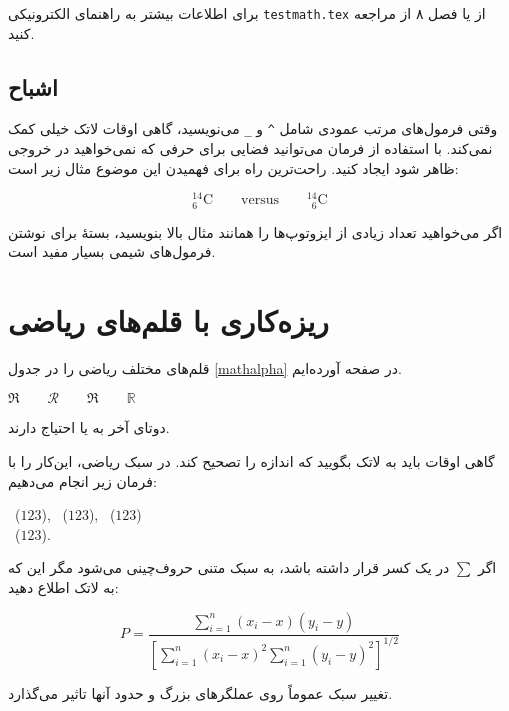برای اطلاعات بیشتر به راهنمای الکترونیکی  \texttt{testmath.tex} از \lr{\AmS-\LaTeX} یا فصل ۸ از \companion{} مراجعه کنید.
\subsection{اشباح}

وقتی فرمول‌های مرتب عمودی شامل  \verb|^| و  \verb|_| می‌نویسید، گاهی اوقات لاتک خیلی کمک نمی‌کند. با استفاده از فرمان   می‌توانید فضایی برای حرفی که نمی‌خواهید در خروجی ظاهر شود ایجاد کنید. راحت‌ترین راه برای فهمیدن این موضوع مثال زیر است:
\begin{example}
\begin{equation*}
{}^{14}_{6}\text{C}
\qquad \text{versus} \qquad
{}^{14}_{\phantom{1}6}\text{C}
\end{equation*}
\end{example}
اگر می‌خواهید تعداد زیادی از ایزو‌توپ‌ها را همانند مثال بالا بنویسید، بستۀ   برای نوشتن فرمول‌های شیمی بسیار مفید است.
\section{ریزه‌کاری با قلم‌های ریاضی}\label{sec:fontsz}
قلم‌های مختلف ریاضی را در جدول  
\ref{mathalpha}
در صفحه 
\pageref{mathalpha} آورده‌ایم.
\begin{example}
 $\Re \qquad
  \mathcal{R} \qquad
  \mathfrak{R} \qquad
  \mathbb{R} \qquad $  
\end{example}
دوتای آخر به   یا   احتیاج دارند.

گاهی اوقات باید به لاتک بگویید که اندازه را تصحیح کند. در سبک ریاضی، این‌کار را با فرمان زیر انجام می‌دهیم:

\begin{latin}
~($\displaystyle 123$),
 ~($\textstyle 123$), 
~($\scriptstyle 123$) \\
~($\scriptscriptstyle 123$).
\end{latin}

اگر $\sum$ در یک کسر قرار داشته باشد، به سبک متنی حروف‌چینی می‌شود مگر این که به لاتک اطلاع دهید:
\begin{example}
\begin{equation*}
 P = \frac{\displaystyle{ 
   \sum_{i=1}^n (x_i- x)
   (y_i- y)}} 
   {\displaystyle{\left[
   \sum_{i=1}^n(x_i-x)^2
   \sum_{i=1}^n(y_i- y)^2
   \right]^{1/2}}}
\end{equation*}    
\end{example}
تغییر سبک عموماً روی عملگرهای بزرگ و حدود آنها تاثیر می‌گذارد.

